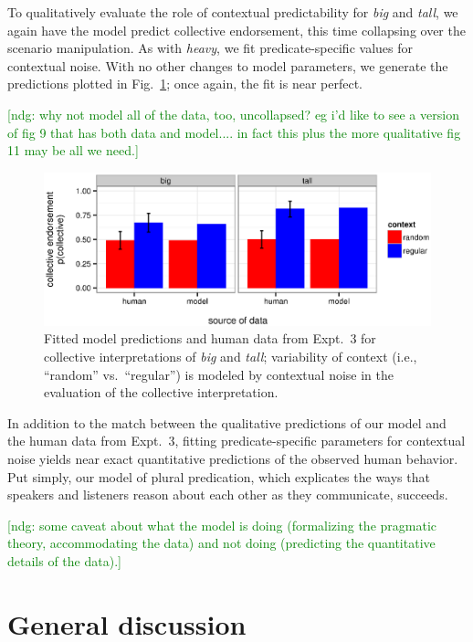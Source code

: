 \documentclass[linguex]{sp}
\newcommand{\ndg}[1]{\textcolor{Green}{[ndg: #1]}}
\begin{document}
To qualitatively evaluate the role of contextual predictability for \emph{big} and \emph{tall}, we again have the model predict collective endorsement, this time collapsing over the scenario manipulation. As with \emph{heavy}, we fit predicate-specific values for contextual noise.  With no other changes to model parameters, we generate the predictions plotted in Fig.~\ref{bigtallmodel}; once again, the fit is near perfect.

\ndg{why not model all of the data, too, uncollapsed? eg i'd like to see a version of fig 9 that has both data and model.... in fact this plus the more qualitative fig 11 may be all we need.}

\begin{figure}[h]
	\centering
	\includegraphics[width=\linewidth]{plots/bigtallmodel.eps}
	\vspace{-20pt}
	\caption{Fitted model predictions and human data from Expt.~3 for collective interpretations of \emph{big} and \emph{tall}; variability of context (i.e., ``random'' vs.~``regular'') is modeled by contextual noise in the evaluation of the collective interpretation.} \label{bigtallmodel}
\end{figure}

In addition to the match between the qualitative predictions of our model and the human data from Expt.~3, fitting predicate-specific parameters for contextual noise yields near exact quantitative predictions of the observed human behavior. Put simply, our model of plural predication, which explicates the ways that speakers and listeners reason about each other as they communicate, succeeds. %

\ndg{some caveat about what the model is doing (formalizing the pragmatic theory, accommodating the data) and not doing (predicting the quantitative details of the data).}

\section{General discussion}
\end{document}
